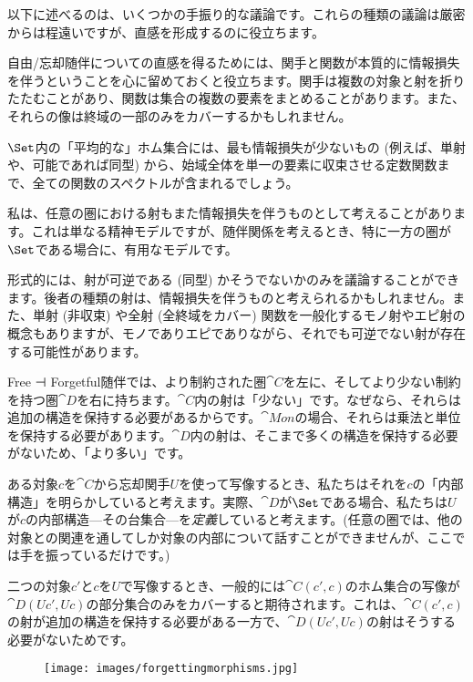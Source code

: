 以下に述べるのは、いくつかの手振り的な議論です。これらの種類の議論は厳密からは程遠いですが、直感を形成するのに役立ちます。

自由/忘却随伴についての直感を得るためには、関手と関数が本質的に情報損失を伴うということを心に留めておくと役立ちます。関手は複数の対象と射を折りたたむことがあり、関数は集合の複数の要素をまとめることがあります。また、それらの像は終域の一部のみをカバーするかもしれません。

$\Set$内の「平均的な」ホム集合には、最も情報損失が少ないもの (例えば、単射や、可能であれば同型) から、始域全体を単一の要素に収束させる定数関数まで、全ての関数のスペクトルが含まれるでしょう。

私は、任意の圏における射もまた情報損失を伴うものとして考えることがあります。これは単なる精神モデルですが、随伴関係を考えるとき、特に一方の圏が$\Set$である場合に、有用なモデルです。

形式的には、射が可逆である (同型) かそうでないかのみを議論することができます。後者の種類の射は、情報損失を伴うものと考えられるかもしれません。また、単射 (非収束) や全射 (全終域をカバー) 関数を一般化するモノ射やエピ射の概念もありますが、モノでありエピでありながら、それでも可逆でない射が存在する可能性があります。

Free ⊣ Forgetful随伴では、より制約された圏$\cat{C}$を左に、そしてより少ない制約を持つ圏$\cat{D}$を右に持ちます。$\cat{C}$内の射は「少ない」です。なぜなら、それらは追加の構造を保持する必要があるからです。$\cat{Mon}$の場合、それらは乗法と単位を保持する必要があります。$\cat{D}$内の射は、そこまで多くの構造を保持する必要がないため、「より多い」です。

ある対象$c$を$\cat{C}$から忘却関手$U$を使って写像するとき、私たちはそれを$c$の「内部構造」を明らかしていると考えます。実際、$\cat{D}$が$\Set$である場合、私たちは$U$が$c$の内部構造---その台集合---を\emph{定義}していると考えます。(任意の圏では、他の対象との関連を通してしか対象の内部について話すことができませんが、ここでは手を振っているだけです。) 

二つの対象$c'$と$c$を$U$で写像するとき、一般的には$\cat{C}(c', c)$のホム集合の写像が$\cat{D}(U c', U c)$の部分集合のみをカバーすると期待されます。これは、$\cat{C}(c', c)$の射が追加の構造を保持する必要がある一方で、$\cat{D}(U c', U c)$の射はそうする必要がないためです。

\begin{figure}[H]
  \centering
  \texttt{[image: images/forgettingmorphisms.jpg]}
\end{figure}

